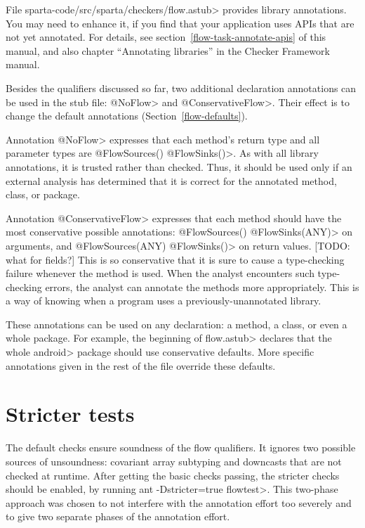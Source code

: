 File \<sparta-code/src/sparta/checkers/flow.astub> provides library
annotations.  You may need to enhance it, if you find that your application
uses APIs that are not yet annotated.  For details, see
section~\ref{flow-task-annotate-apis} of this manual, and also 
chapter
``Annotating libraries'' in the Checker Framework manual.

\label{ConservativeFlow}

Besides the qualifiers discussed so far, two additional declaration
annotations can be used in the stub file: \<@NoFlow> and \<@ConservativeFlow>.
Their effect is to change the default annotations (Section~\ref{flow-defaults}).

Annotation \<@NoFlow> expresses that each method's return type and all
parameter types are \<@FlowSources({}) @FlowSinks({})>.  As with all
library annotations, it is trusted rather than checked.  Thus, it should be
used only if an external analysis has determined that it is correct for the
annotated method, class, or package.

Annotation \<@ConservativeFlow> expresses that each method should have the
most conservative possible annotations:
  \<@FlowSources({}) @FlowSinks(ANY)> on arguments, and
  \<@FlowSources(ANY) @FlowSinks({})> on return values.
[TODO: what for fields?]
This is so conservative that it is sure to cause a type-checking failure
whenever the method is used.
When the analyst encounters such type-checking errors, the analyst can
annotate the methods more appropriately.  This is a way of knowing when a
program uses a previously-unannotated library.

These annotations can be used on any declaration: a method, a class,
or even a whole package.
For example, the beginning of \<flow.astub> declares that the
whole \<android> package should use conservative defaults.
More specific annotations given in the rest of the file override these
defaults.


\section{Stricter tests}

The default checks ensure soundness of the flow qualifiers.
It ignores two possible sources of unsoundness: covariant array
subtyping and downcasts that are not checked at runtime.
After getting the basic checks passing, the stricter checks should be
enabled, by running \<ant -Dstricter=true flowtest>.
This two-phase approach was chosen to not interfere with
the annotation effort too severely and to give two separate phases of
the annotation effort.


